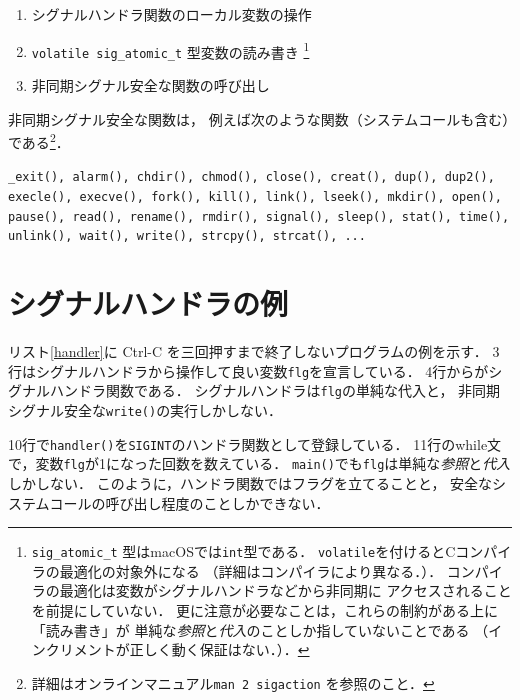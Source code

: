 \begin{enumerate}
\item シグナルハンドラ関数のローカル変数の操作
\item \texttt{volatile sig\_atomic\_t} 型変数の読み書き
  \footnote{\texttt{sig\_atomic\_t} 型はmacOSでは\texttt{int}型である．
    \texttt{volatile}を付けるとCコンパイラの最適化の対象外になる
           （詳細はコンパイラにより異なる．）．
           コンパイラの最適化は変数がシグナルハンドラなどから非同期に
           アクセスされることを前提にしていない．
           更に注意が必要なことは，これらの制約がある上に「読み書き」が
           単純な\emph{参照}と\emph{代入}のことしか指していないことである
           （インクリメントが正しく動く保証はない．）．}
\item 非同期シグナル安全な関数の呼び出し
\end{enumerate}

非同期シグナル安全な関数は，
例えば次のような関数（システムコールも含む）である\footnote{
詳細はオンラインマニュアル\texttt{man 2 sigaction} を参照のこと．}．

\texttt{\_exit(), alarm(), chdir(), chmod(), close(), creat(), dup(),
dup2(), execle(), execve(), fork(), kill(), link(), lseek(), mkdir(),
open(), pause(), read(), rename(), rmdir(), signal(), sleep(), stat(),
time(), unlink(), wait(), write(), strcpy(), strcat(), ...}

\section{シグナルハンドラの例}
リスト\ref{handler}に Ctrl-C を三回押すまで終了しないプログラムの例を示す．
3行はシグナルハンドラから操作して良い変数\texttt{flg}を宣言している．
4行からがシグナルハンドラ関数である．
シグナルハンドラは\texttt{flg}の単純な代入と，
非同期シグナル安全な\texttt{write()}の実行しかしない．



10行で\texttt{handler()}を\texttt{SIGINT}のハンドラ関数として登録している．
11行のwhile文で，変数\texttt{flg}が1になった回数を数えている．
\texttt{main()}でも\texttt{flg}は単純な\emph{参照}と\emph{代入}しかしない．
このように，ハンドラ関数ではフラグを立てることと，
安全なシステムコールの呼び出し程度のことしかできない．

